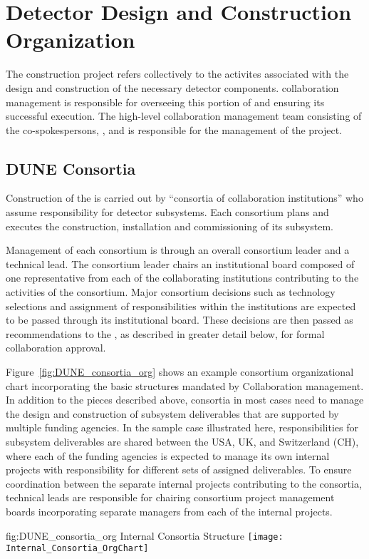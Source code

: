 \chapter{Detector Design and Construction Organization}
\label{vl:tc-overview}

The   construction project refers collectively 
to the activites associated with the design and construction of the
necessary detector components.   collaboration management 
is responsible for overseeing this portion of  and 
ensuring its successful execution.  The high-level  
collaboration management team consisting of the co-spokespersons, 
, and  is responsible for the
management of the project.  

\section{DUNE Consortia}
\label{sec:consortia}

Construction of the   is carried out by 
``consortia of collaboration institutions'' who assume responsibility 
for detector subsystems.  Each consortium plans and executes the 
construction, installation and commissioning of its subsystem.

Management of each consortium is through an overall consortium leader 
and a technical lead.  The consortium leader chairs an institutional 
board composed of one representative from each of the collaborating 
institutions contributing to the activities of the consortium.  Major 
consortium decisions such as technology selections and assignment of 
responsibilities within the institutions are expected to be passed 
through its institutional board.  These decisions are then passed 
as recommendations to the  , as described in 
greater detail below, for formal collaboration approval.

Figure~\ref{fig:DUNE_consortia_org} shows an example consortium 
organizational chart incorporating the basic structures mandated 
by  Collaboration management.  In addition to the pieces 
described above, consortia in most cases need to manage the design 
and construction of subsystem deliverables that are supported by 
multiple funding agencies.  In the sample case illustrated here, 
responsibilities for subsystem deliverables are shared between the 
USA, UK, and Switzerland (CH), where each of the funding agencies 
is expected to manage its own internal projects with responsibility 
for different sets of assigned deliverables.  To ensure coordination 
between the separate internal projects contributing to the consortia, 
technical leads are responsible for chairing consortium project 
management boards incorporating separate managers from each of 
the internal projects.   
\begin{dunefigure}{fig:DUNE_consortia_org}
  { Internal Consortia Structure}
  \texttt{[image: Internal\_Consortia\_OrgChart]}
\end{dunefigure}

